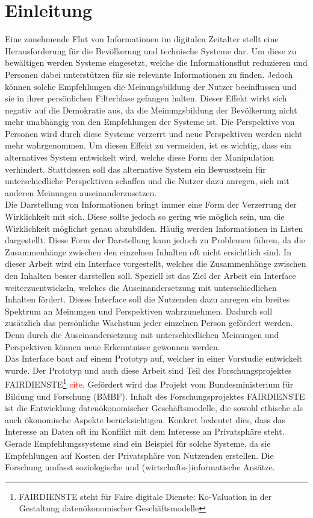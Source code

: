 \section{Einleitung}
Eine zunehmende Flut von Informationen im digitalen Zeitalter stellt eine Herausforderung für die Bevölkerung und technische Systeme dar.
Um diese zu bewältigen werden Systeme eingesetzt, welche die Informationsflut reduzieren und Personen dabei unterstützen für sie relevante Informationen zu finden.
Jedoch können solche Empfehlungen die Meinungsbildung der Nutzer beeinflussen und sie in ihrer persönlichen Filterblase gefangen halten.
Dieser Effekt wirkt sich negativ auf die Demokratie aus, da die Meinungsbildung der Bevölkerung nicht mehr unabhängig von den Empfehlungen der Systeme ist.
Die Perspektive von Personen wird durch diese Systeme verzerrt und neue Perspektiven werden nicht mehr wahrgenommen.
Um diesen Effekt zu vermeiden, ist es wichtig, dass ein alternatives System entwickelt wird, welche diese Form der Manipulation verhindert.
Stattdessen soll das alternative System ein Bewusstsein für unterschiedliche Perspektiven schaffen und die Nutzer dazu anregen, sich mit anderen Meinungen auseinanderzusetzen. \\

Die Darstellung von Informationen bringt immer eine Form der Verzerrung der Wirklichkeit mit sich.
Diese sollte jedoch so gering wie möglich sein, um die Wirklichkeit möglichst genau abzubilden.
Häufig werden Informationen in Listen dargestellt.
Diese Form der Darstellung kann jedoch zu Problemen führen, da die Zusammenhänge zwischen den einzelnen Inhalten oft nicht ersichtlich sind.
In dieser Arbeit wird ein Interface vorgestellt, welches die Zusammenhänge zwischen den Inhalten besser darstellen soll.
Speziell ist das Ziel der Arbeit ein Interface weiterzuentwickeln, welches die Auseinandersetzung mit unterschiedlichen Inhalten fördert.
Dieses Interface soll die Nutzenden dazu anregen ein breites Spektrum an Meinungen und Perspektiven wahrzunehmen.
Dadurch soll zusätzlich das persönliche Wachstum jeder einzelnen Person gefördert werden.
Denn durch die Auseinandersetzung mit unterschiedlichen Meinungen und Perspektiven können neue Erkenntnisse gewonnen werden. \\

Das Interface baut auf einem Prototyp auf, welcher in einer Vorstudie entwickelt wurde.
Der Prototyp und auch diese Arbeit sind Teil des Forschungsprojektes FAIRDIENSTE\footnote{FAIRDIENSTE steht für \glqq Faire digitale Dienste: Ko-Valuation in der Gestaltung datenökonomischer Geschäftsmodelle\grqq{}} \textcolor{red}{cite}.
Gefördert wird das Projekt vom Bundesministerium für Bildung und Forschung (BMBF).
Inhalt des Forschungsprojektes FAIRDIENSTE ist die Entwicklung datenökonomischer Geschäftsmodelle, die sowohl ethische als auch ökonomische Aspekte berücksichtigen.
Konkret bedeutet dies, dass das Interesse an Daten oft im Konflikt mit dem Interesse an Privatsphäre steht.
Gerade Empfehlungssysteme sind ein Beispiel für solche Systeme, da sie Empfehlungen auf Kosten der Privatsphäre von Nutzenden erstellen.
Die Forschung umfasst soziologische und (wirtschafts-)informatische Ansätze. \\


